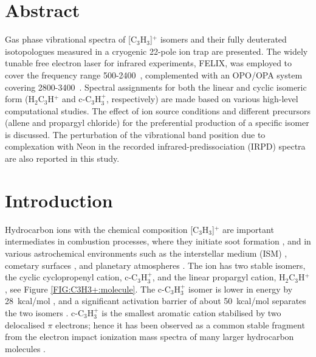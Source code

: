 \newcommand{\iso}{[C$_3$H$_3$]$^+$ }
\newcommand{\isoD}{[C$_3$D$_3$]$^+$ }
\newcommand{\cyc}{c-C$_3$H$_3^+$ }
\newcommand{\cycD}{c-C$_3$D$_3^+$ }
\newcommand{\lin}{H$_2$C$_3$H$^+$ }
\newcommand{\linD}{D$_2$C$_3$D$^+$ }
\newcommand{\ison}{[C$_3$H$_3$]$^+$}
\newcommand{\isoDn}{[C$_3$D$_3$]$^+$}
\newcommand{\cycn}{c-C$_3$H$_3^+$}
\newcommand{\cycDn}{c-C$_3$D$_3^+$}
\newcommand{\linn}{H$_2$C$_3$H$^+$}
\newcommand{\linDn}{D$_2$C$_3$D$^+$}

\section*{Abstract}
Gas phase vibrational spectra of \iso isomers and their fully deuterated isotopologues 
measured in a cryogenic 22-pole ion trap are presented. The widely tunable free electron 
laser for infrared experiments, FELIX, was employed to cover the frequency range 
500-2400~\wn, complemented with an OPO/OPA system covering 2800-3400~\wn. 
Spectral assignments for both the linear and cyclic isomeric form 
(\lin and \cycn, respectively) are made based on various high-level 
computational studies. The effect of ion source conditions and 
different precursors (allene and propargyl chloride) for the preferential 
production of a specific isomer is discussed. 
The perturbation of the vibrational band position due to complexation with Neon in the recorded infrared-predissociation (IRPD) spectra are also reported in this study.
\clearpage

\section{Introduction}
Hydrocarbon ions with the chemical composition \iso are important intermediates in combustion processes, where they initiate soot formation \citep{Goodings1979,Wheeler2007,Miller2005}, and in various astrochemical environments such as the interstellar medium (ISM) \citep{Herbst1983,Adams1987,CGG1991,smith_ion_1992}, cometary surfaces \citep{korth_probable_1989}, and planetary atmospheres \citep{Anicich2000,Ali2013}. The ion has two stable isomers, the cyclic cyclopropenyl cation, \cycn, and the linear propargyl cation, \linn, see Figure \ref{FIG:C3H3+:molecule}. The \cyc isomer is lower in energy by 28~kcal/mol \citep{HTL2011}, and a significant activation barrier of about 50~kcal/mol separates the two isomers \citep{Duncan2012}. \cyc is the smallest aromatic cation stabilised by two delocalised $\pi$ electrons; hence it has been observed as a common stable fragment from the electron impact ionization mass spectra of many larger hydrocarbon molecules \citep{baer_ng_powis_1996,holmes_aubry_mayer_2007}.\\

